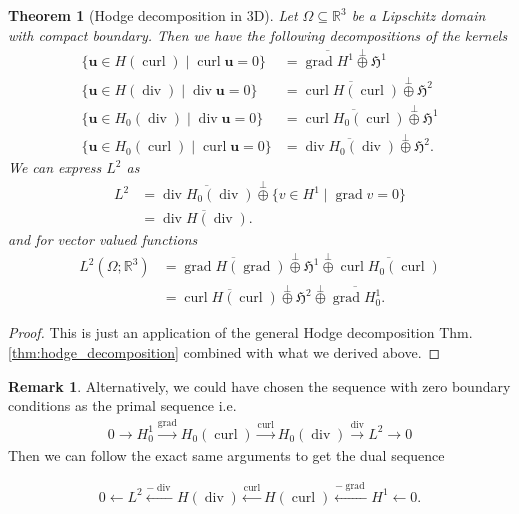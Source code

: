 \documentclass[12pt,a4paper]{article}
\numberwithin{equation}{subsection}
\numberwithin{lemma}{subsection}
\newtheorem{theorem}[lemma]{Theorem}
\theoremstyle{definition}
\newtheorem{remark}[lemma]{Remark}
\DeclareMathOperator{\curl}{curl}
\DeclareMathOperator{\diver}{div}
\DeclareMathOperator{\grad}{grad}
\newcommand{\real}{\mathbb{R}}
\begin{document}
\begin{theorem}[Hodge decomposition in 3D]\label{thm:hodge_decomposition_in_3d}
    Let $\Omega \subseteq \real^3$ be a Lipschitz domain with compact boundary. Then we have the 
    following decompositions of the kernels
    \begin{align*}
        \{ \mathbf{u} \in H(\curl) \mid \curl \mathbf{u} = 0\}
        &= \overline{\grad H^1} \stackrel{\perp}{\oplus} 
            \mathfrak{H}^1
        \\ \{ \mathbf{u} \in H(\diver) \mid \diver \mathbf{u} = 0\}
        &= \overline{\curl H(\curl)} \stackrel{\perp}{\oplus} 
            \mathfrak{H}^2
        \\ \{ \mathbf{u} \in H_0(\diver) \mid \diver \mathbf{u} = 0\}
        &= \overline{\curl H_0(\curl)} \stackrel{\perp}{\oplus} 
            \mathfrak{H}^1
        \\ \{ \mathbf{u} \in H_0(\curl) \mid \curl \mathbf{u} = 0\}
        &= \overline{\diver H_0(\diver)} \stackrel{\perp}{\oplus} 
            \mathfrak{H}^2.
    \end{align*}
    We can express $L^2$ as
    \begin{align*}
        L^2 &= \overline{\diver H_0(\diver)} \stackrel{\perp}{\oplus} 
            \{ v \in H^1 \mid \grad v = 0 \}
        \\ &= \overline{\diver H(\diver)}.
    \end{align*}
    and for vector valued functions
    \begin{align*}
        L^2(\Omega;\real^3) &= \overline{\grad H(\grad)} 
            \stackrel{\perp}{\oplus} \mathfrak{H}^1 
            \stackrel{\perp}{\oplus} \overline{\curl H_0(\curl)} 
        \\ &= \overline{\curl H(\curl)}
            \stackrel{\perp}{\oplus} \mathfrak{H}^2
            \stackrel{\perp}{\oplus} \overline{\grad H^1_0}.
    \end{align*}
\end{theorem}
\begin{proof}
    This is just an application of the general Hodge decomposition 
    Thm.\,\ref{thm:hodge_decomposition} combined with what we derived above.
\end{proof}


\begin{remark}
    Alternatively, we could have chosen the sequence with zero boundary conditions
    as the primal sequence i.e. 
    \begin{align*}
        0 \rightarrow H^1_0 \xrightarrow{\grad} H_0(\curl)
        \xrightarrow{\curl} H_0(\diver) 
        \xrightarrow{\diver} L^2 \rightarrow 0
    \end{align*}
    Then we can follow the exact same arguments to get the dual sequence 

    \begin{align*}
        0 \leftarrow L^2 \xleftarrow{-\diver} H(\diver)
            \xleftarrow{\curl} H(\curl) 
            \xleftarrow{-\grad} H^1 \leftarrow 0.
    \end{align*}
\end{remark}
\end{document}
